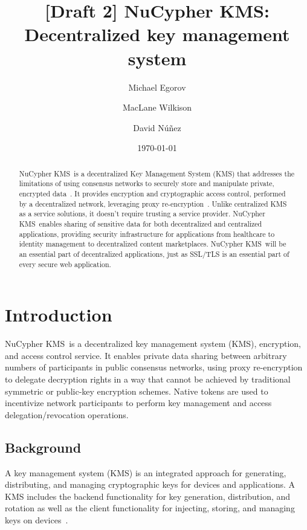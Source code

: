 \documentclass[longbibliography,nofootinbib]{revtex4-1}
\newcommand{\kms}{NuCypher KMS}
\begin{document}
\title{[Draft 2] \kms: Decentralized key management system}

\author{Michael Egorov}
\author{MacLane Wilkison}

\author{David N{\'u}{\~n}ez}

\begin{abstract}
    \kms~is a decentralized Key Management System (KMS) that addresses the limitations of using consensus
    networks to securely store and manipulate private, encrypted data~\cite{cryptoeprint:2017:201}.
    It provides encryption and cryptographic access control, performed by a decentralized network,
    leveraging proxy re-encryption~\cite{wiki:pre}.
    Unlike centralized KMS as a service solutions, it doesn't require trusting a service provider.
    \kms~enables sharing of sensitive data for both decentralized and centralized applications,
    providing security infrastructure for applications from healthcare to identity management to decentralized content marketplaces.
    \kms~will be an essential part of decentralized applications,
    just as SSL/TLS is an essential part of every secure web application.
\end{abstract}

\date{\today}
\maketitle

\tableofcontents


\section{Introduction}

\kms~is a decentralized key management system (KMS), encryption, and access control service.
It enables private data sharing between arbitrary numbers of participants in public consensus networks,
using proxy re-encryption to delegate decryption rights in a way that cannot be achieved by traditional symmetric or public-key encryption schemes. 
Native tokens are used to incentivize network participants to perform key management and access delegation/revocation operations.

\subsection{Background}
A key management system (KMS) is an integrated approach for generating, distributing, and managing cryptographic keys for devices and
applications.
A KMS includes the backend functionality for key generation, distribution, and rotation as well as the client functionality for
injecting, storing, and managing keys on devices~\cite{wiki:kms}.
\end{document}
